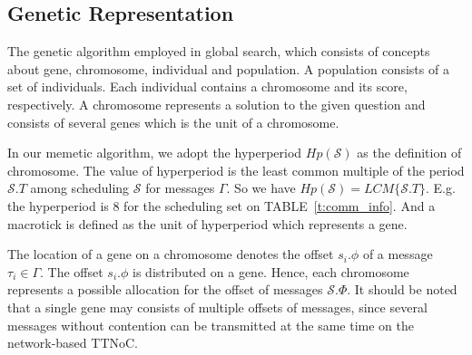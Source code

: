 \documentclass[10pt,journal]{IEEEtran}
\newcommand{\calS}{\mathcal{S}}
\theoremstyle{remark}
\begin{document}
\subsection{Genetic Representation}

The genetic algorithm employed in global search, which consists of concepts about gene, chromosome,
 individual and population. 
A population consists of a set of individuals. 
Each individual contains a chromosome and its score, respectively.
A chromosome represents a solution to the given question and consists of several genes which is the unit of a chromosome.

In our memetic algorithm,
 we adopt the hyperperiod $Hp(\calS)$ as the definition of chromosome.
The value of hyperperiod is the least common multiple of the period $\calS.T$ among scheduling $\calS$ for messages $\Gamma$.
So we have $Hp(\calS) = LCM\{\calS.T\}$.
E.g. the hyperperiod is 8 for the scheduling set on TABLE~\ref{t:comm_info}. 
And a macrotick is defined as the unit of hyperperiod which represents a gene.


The location of a gene on a chromosome denotes the offset $ s_i.\phi $ of a message $\tau_i\in\Gamma$.
The offset $s_i.\phi$ is distributed on a gene.
Hence, each chromosome represents a possible allocation for the offset of messages $\calS.\Phi$.
It should be noted that a single gene may consists of multiple offsets of messages,
 since several messages without contention can be transmitted at the same time on the network-based TTNoC.
\end{document}
